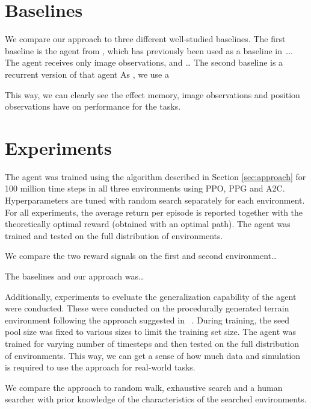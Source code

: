 
\section{Baselines}
\label{sec:baseline}

We compare our approach to three different well-studied baselines.
The first baseline is the agent from \cite{mnih_human_2015}, which has previously been used as a baseline in \dots.
The agent receives only image observations, and \dots
The second baseline is a recurrent version of that agent
As \cite{mirowski_navigate_2017}, we use a 

This way, we can clearly see the effect memory, image observations and position observations have on performance for the tasks.

\section{Experiments}
\label{sec:experiments}

The agent was trained using the algorithm described in Section \ref{sec:approach} for 100 million time steps in all three environments using PPO, PPG and A2C.
Hyperparameters are tuned with random search separately for each environment.
For all experiments, the average return per episode is reported together with the theoretically optimal reward (obtained with an optimal path).
The agent was trained and tested on the full distribution of environments.

We compare the two reward signals on the first and second environment\dots

The baselines and our approach was\dots

Additionally, experiments to eveluate the generalization capability of the agent were conducted.
These were conducted on the procedurally generated terrain environment following the approach suggested in ~\cite{procgen}.
During training, the seed pool size was fixed to various sizes to limit the training set size.
The agent was trained for varying number of timesteps and then tested on the full distribution of environments.
This way, we can get a sense of how much data and simulation is required to use the approach for real-world tasks.

We compare the approach to random walk, exhaustive search and a human searcher with prior knowledge of the characteristics of the searched environments.

